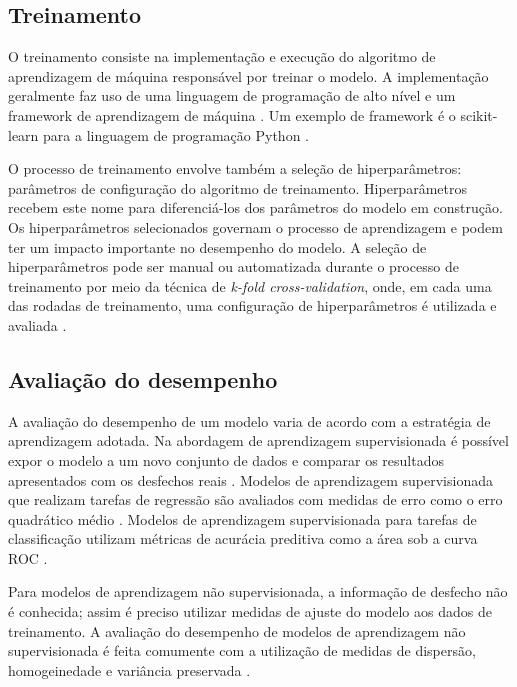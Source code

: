 \subsection{Treinamento}

O treinamento consiste na implementação e execução do algoritmo de aprendizagem de máquina responsável por treinar o modelo. A implementação geralmente faz uso de
uma linguagem de programação de alto nível e um framework de aprendizagem de máquina \cite{Greener2021}. Um exemplo de framework é o scikit-learn \cite{ScikitLearn}
para a linguagem de programação Python \cite{Python}.

O processo de treinamento envolve também a seleção de hiperparâmetros: parâmetros de configuração do algoritmo de treinamento. Hiperparâmetros recebem este nome para
diferenciá-los dos parâmetros do modelo em construção. Os hiperparâmetros selecionados governam o processo de aprendizagem e podem ter um impacto importante no desempenho
do modelo. A seleção de hiperparâmetros pode ser manual ou automatizada durante o processo de treinamento por meio da técnica de \textit{k-fold cross-validation}, onde,
em cada uma das rodadas de treinamento, uma configuração de hiperparâmetros é utilizada e avaliada \cite{Delgadillo2020}.

\subsection{Avaliação do desempenho}

A avaliação do desempenho de um modelo varia de acordo com a estratégia de aprendizagem adotada. Na abordagem de aprendizagem supervisionada é possível expor o modelo a um
novo conjunto de dados e comparar os resultados apresentados com os desfechos reais \cite{Greener2021}. Modelos de aprendizagem supervisionada que realizam tarefas de regressão
são avaliados com medidas de erro como o erro quadrático médio \cite{Delgadillo2020}. Modelos de aprendizagem supervisionada para tarefas de classificação utilizam métricas de
acurácia preditiva como a área sob a curva ROC \cite{Greener2021}.

Para modelos de aprendizagem não supervisionada, a informação de desfecho não é conhecida; assim é preciso utilizar medidas de ajuste do modelo aos dados de treinamento. 
A avaliação do desempenho de modelos de aprendizagem não supervisionada é feita comumente com a utilização de medidas de dispersão, homogeinedade e variância preservada
\cite{Naeem2023}.